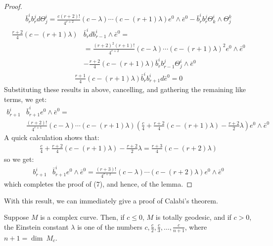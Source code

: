 \begin{proof}
%
\begin{align*}
\bar{b}^i_r b^j_r d \Theta^i_j = \frac{c(r+2)!}{4^{r+2}} (c - \lambda) \cdots (c - (r+1) \lambda) e^0 \wedge \bar{e}^0 - \bar{b}^i_r b^j_r \Theta^i_k \wedge \Theta^k_j
\end{align*}
%
\begin{align*}
\frac{r+2}{4}( c  - (r+1) \lambda ) & \bar{b}^i_r d b^i_{r-1} \wedge \bar{e}^0 = \\
&= \frac{ (r+2)^2 (r+1)!}{4^{r+2}} (c - \lambda) \cdots (c - (r+1) \lambda)^2 e^0 \wedge \bar{e}^0 \\
&- \frac{r+2}{4}(c - (r+1) \lambda) \bar{b}^i_r b^j_{r-1} \Theta^i_j \wedge \bar{e}^0
\end{align*}
%
\begin{align*}
\frac{r+1}{4} (c - (r+1) \lambda ) \bar{b}^i_r b^i_{r+1} d \bar{e}^0 = 0
\end{align*}
%
Substituting these results in above, cancelling, and gathering the remaining like terms, we get:
%
\begin{align*}
b^i_{r+1} & \bar{b}^i_{r+1}  e^0 \wedge \bar{e}^0 = \\
& \frac{(r+2)!}{4^{r+1}} (c- \lambda) \cdots (c - (r+1) \lambda) \left( \frac{c}{4} + \frac{r+2}{4}(c - (r+1) \lambda) - \frac{r + 2}{2} \lambda \right) e^0 \wedge \bar{e}^0
\end{align*}
%
A quick calculation shows that:
%
\begin{align*}
\frac{c}{4} + \frac{r+2}{4}(c - (r+1) \lambda) - \frac{r + 2}{2} \lambda = \frac{r+3}{4}( c - (r+2) \lambda )
\end{align*}
%
so we get:
%
\begin{align*}
b^i_{r+1} & \bar{b}^i_{r+1}  e^0 \wedge \bar{e}^0 = \frac{(r+3)!}{4^{r+2}}(c - \lambda) \cdots (c - (r+2) \lambda) e^0 \wedge \bar{e}^0
\end{align*}
%
which completes the proof of (7), and hence, of the lemma.
%
\end{proof}

With this result, we can immediately give a proof of Calabi's theorem.

\begin{thm} Suppose $M$ is a complex curve.  Then, if $c \leq 0$, $M$ is totally geodesic, and if $c > 0$, the Einstein constant $\lambda$ is one of the numbers $c, \frac{c}{2}, \frac{c}{3}, \ldots, \frac{c}{n + 1}$, where $n + 1 = \dim \ M_c$.
\end{thm}


